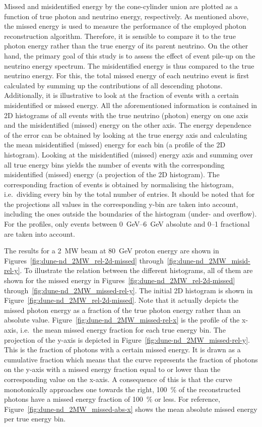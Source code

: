 Missed and misidentified energy by the cone-cylinder union are plotted as a function of true photon and neutrino energy, respectively.
As mentioned above, the missed energy is used to measure the performance of the employed photon reconstruction algorithm.
Therefore, it is sensible to compare it to the true photon energy rather than the true energy of its parent neutrino.
On the other hand, the primary goal of this study is to assess the effect of event pile-up on the neutrino energy spectrum.
The misidentified energy is thus compared to the true neutrino energy.
For this, the total missed energy of each neutrino event is first calculated by summing up the contributions of all descending \Pgpz photons.
Additionally, it is illustrative to look at the fraction of events with a certain misidentified or missed energy.
All the aforementioned information is contained in 2D histograms of all events with the true neutrino (photon) energy on one axis and the misidentified (missed) energy on the other axis.
The energy dependence of the error can be obtained by looking at the true energy axis and calculating the mean misidentified (missed) energy for each bin (a profile of the 2D histogram).
Looking at the misidentified (missed) energy axis and summing over all true energy bins yields the number of events with the corresponding misidentified (missed) energy (a projection of the 2D histogram).
The corresponding fraction of events is obtained by normalising the histogram, i.e.\ dividing every bin by the total number of entries.
It should be noted that for the projections all values in the corresponding y-bin are taken into account, including the ones outside the boundaries of the histogram (under- and overflow).
For the profiles, only events between \SIrange{0}{6}{\giga\electronvolt} absolute and \numrange{0}{1} fractional are taken into account.

The results for a \SI{2}{\mega\watt} beam at \SI{80}{\giga\electronvolt} proton energy are shown in Figures~\ref{fig:dune-nd_2MW_rel-2d-missed} through~\ref{fig:dune-nd_2MW_misid-rel-y}.
To illustrate the relation between the different histograms, all of them are shown for the missed energy in Figures~\ref{fig:dune-nd_2MW_rel-2d-missed} through~\ref{fig:dune-nd_2MW_missed-rel-y}.
The initial 2D histogram is shown in Figure~\ref{fig:dune-nd_2MW_rel-2d-missed}.
Note that it actually depicts the missed photon energy as a fraction of the true photon energy rather than an absolute value.
Figure~\ref{fig:dune-nd_2MW_missed-rel-x} is the profile of the x-axis, i.e.\ the mean missed energy fraction for each true energy bin.
The projection of the y-axis is depicted in Figure~\ref{fig:dune-nd_2MW_missed-rel-y}.
This is the fraction of photons with a certain missed energy.
It is drawn as a cumulative fraction which means that the curve represents the fraction of photons on the y-axis with a missed energy fraction equal to or lower than the corresponding value on the x-axis.
A consequence of this is that the curve monotonically approaches one towards the right, \SI{100}{\percent} of the reconstructed photons have a missed energy fraction of \SI{100}{\percent} or less.
For reference, Figure~\ref{fig:dune-nd_2MW_missed-abs-x} shows the mean absolute missed energy per true energy bin.

